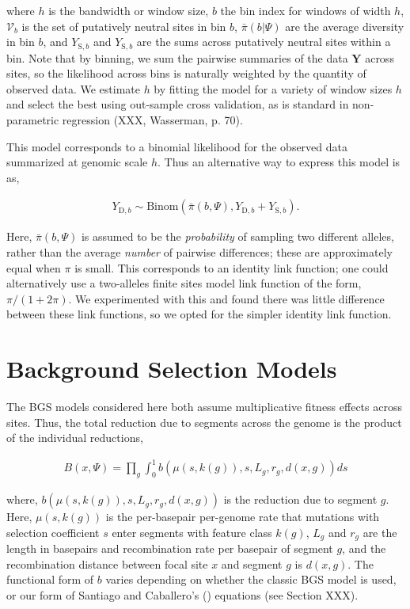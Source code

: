 \documentclass[11pt]{article}
\begin{document}
where $h$ is the bandwidth or window size, $b$ the bin index for windows of
width $h$, $\mathcal{V}_b$ is the set of putatively neutral sites in bin $b$,
$\bar{\pi}(b | \Psi)$ are the average diversity in bin $b$, and
$Y_{\text{S},b}$ and $Y_{\text{S},b}$ are the sums across putatively neutral
sites within a bin. Note that by binning, we sum the pairwise summaries of the
data $\mathbf{Y}$ across sites, so the likelihood across bins is naturally
weighted by the quantity of observed data. We estimate $h$ by fitting the model
for a variety of window sizes $h$ and select the best using out-sample cross
validation, as is standard in non-parametric regression (XXX, Wasserman, p.
70).

This model corresponds to a binomial likelihood for the observed data
summarized at genomic scale $h$. Thus an alternative way to express this model
is as, 

\begin{align}
  Y_{\text{D},b} \sim \text{Binom}(\bar{\pi}(b, \Psi), Y_{\text{D},b} + Y_{\text{S},b}).
\end{align}

Here, $\bar{\pi}(b, \Psi)$ is assumed to be the \emph{probability} of sampling
two different alleles, rather than the average \emph{number} of pairwise
differences; these are approximately equal when $\pi$ is small. This
corresponds to an identity link function; one could alternatively use a
two-alleles finite sites model link function of the form, $\pi/(1 + 2 \pi)$. We
experimented with this and found there was little difference between these link
functions, so we opted for the simpler identity link function.


\section{Background Selection Models}

The BGS models considered here both assume multiplicative fitness effects
across sites. Thus, the total reduction due to segments across the genome is
the product of the individual reductions, 

\begin{align}
  \label{suppeqn:b}
  B(x, \Psi) = \prod_g \int_0^1 b(\mu(s, k(g)), s, L_g, r_g, d(x, g)) ds
\end{align}

where, $b(\mu(s, k(g)), s, L_g, r_g, d(x,g))$ is the reduction due to segment
$g$. Here, $\mu(s, k(g))$ is the per-basepair per-genome rate that mutations
with selection coefficient $s$ enter segments with feature class $k(g)$, $L_g$
and $r_g$ are the length in basepairs and recombination rate per basepair of
segment $g$, and the recombination distance between focal site $x$ and segment
$g$ is $d(x, g)$. The functional form of $b$ varies depending on whether the
classic BGS model is used, or our form of Santiago and Caballero's
(\citeyear{Santiago2016-mu}) equations (see Section XXX).
\end{document}
